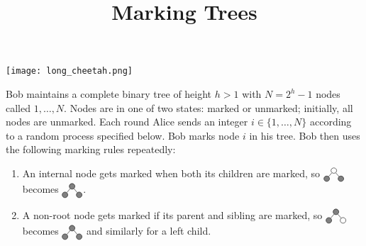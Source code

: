 \documentclass{tufte-handout}
\title{\sf Marking Trees}
\date{}
\begin{document}
\maketitle
{}

\begin{marginfigure}\texttt{[image: long\_cheetah.png]}
\end{marginfigure}

  \medskip\noindent Bob maintains a complete binary tree of height
  $h>1$ with $N=2^h-1$ nodes called $1,\ldots, N$.
  Nodes are in one of two states: marked or unmarked; initially, all
  nodes are unmarked.
  Each round Alice sends an integer $i\in \{1,\ldots, N\}$ according
  to a random process specified below.
  Bob marks node $i$ in his tree.
  Bob then uses the following marking rules repeatedly:
\begin{enumerate}
\item An internal node gets marked when both its children are marked,
  so $\vcenter{\hbox{\begin{tikzpicture}[inner sep = 2pt, every
        node/.style={draw,circle}] \node[fill=gray] (u) at (0,0) { };
        \node[fill=gray] (v) at (.5,0) { }; \node (w) at (.25,.3) { };

  \draw[-] (w) edge (u);
  \draw[-] (w) edge (v);
\end{tikzpicture}}}$
becomes
$\vcenter{\hbox{\begin{tikzpicture}[inner sep = 2pt, every node/.style={draw,circle}]
  \node[fill=gray] (u) at (0,0) { };
  \node[fill=gray] (v) at (.5,0) {  };
  \node[fill=gray] (w) at (.25,.3) {  };

  \draw[-] (w) edge (u);
  \draw[-] (w) edge (v);
\end{tikzpicture}}}$.

\item A non-root node gets marked if its parent and sibling are
  marked, so
$\vcenter{\hbox{\begin{tikzpicture}[inner sep = 2pt, every node/.style={draw,circle}]
  \node[fill=gray] (u) at (0,0) { };
  \node (v) at (.5,0) {  };
  \node[fill=gray] (w) at (.25,.3) {  };

  \draw[-] (w) edge (u);
  \draw[-] (w) edge (v);
\end{tikzpicture}}}$
becomes
$\vcenter{\hbox{\begin{tikzpicture}[inner sep = 2pt,every node/.style={draw,circle}]
  \node[fill=gray] (u) at (0,0) { };
  \node[fill=gray] (v) at (.5,0) {  };
  \node[fill=gray] (w) at (.25,.3) {  };

  \draw[-] (w) edge (u);
  \draw[-] (w) edge (v);
\end{tikzpicture}}}$
and similarly for a left child.
\end{enumerate}
\end{document}
